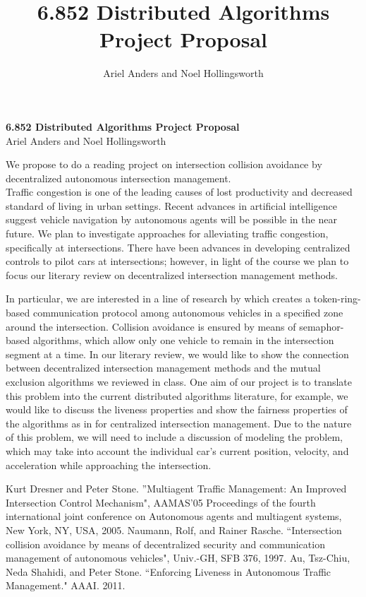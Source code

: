 \documentclass[12pt]{article}
\title{6.852 Distributed Algorithms Project Proposal}
\author{Ariel Anders and Noel Hollingsworth}
\begin{document}
\begin{center}{\bf \Large
6.852 Distributed Algorithms Project Proposal\\ }
Ariel Anders and Noel Hollingsworth 
\end{center}
We propose to do a reading project on intersection collision avoidance by decentralized autonomous intersection management.  \\

Traffic congestion is one of the leading causes of lost productivity and decreased standard of living in urban settings. Recent advances in artificial intelligence suggest vehicle navigation by autonomous agents will be possible in the near future.\cite{dresner}  We plan to investigate approaches for alleviating traffic congestion, specifically at intersections.  There have been advances in developing centralized controls to pilot cars at intersections; however, in light of the course we plan to focus our literary review on decentralized intersection management methods.

In particular, we are interested in a line of research by \cite{naumann} which creates a
token-ring-based communication protocol among autonomous vehicles in a specified zone around the
intersection.  Collision avoidance is ensured by means of semaphor-based algorithms, which allow
only one vehicle to remain in the intersection segment at a time.  In our literary review, we would
like to show the connection between decentralized intersection management methods and the mutual
exclusion algorithms we reviewed in class.  One aim of our project is to translate this problem into
the current distributed algorithms literature, for example, we would like to discuss the liveness
properties and show the fairness properties of the algorithms as in \cite{tszchiu} for
centralized intersection management. Due to the nature of
this problem, we will need to include a discussion of modeling the problem, which may take into
account the individual car's current position, velocity, and acceleration while approaching the
intersection. 
\begin{thebibliography}{9}

Kurt Dresner and Peter Stone. ''Multiagent Traffic Management: An Improved Intersection
Control Mechanism", AAMAS'05 Proceedings of the fourth international joint conference on Autonomous agents and multiagent systems, New York, NY, USA, 2005.
Naumann, Rolf, and Rainer Rasche. ``Intersection collision avoidance by means of decentralized security and communication management of autonomous vehicles", Univ.-GH, SFB 376, 1997.
Au, Tsz-Chiu, Neda Shahidi, and Peter Stone. ``Enforcing Liveness in Autonomous Traffic Management." AAAI. 2011.
\end{thebibliography}
\end{document}
